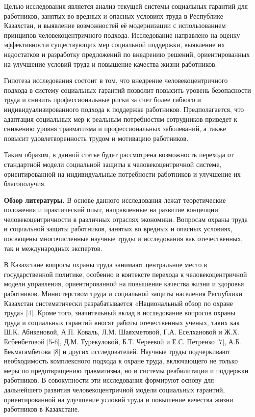 \begin{multicols}{2}
Целью исследования является анализ текущей системы социальных гарантий
для работников, занятых во вредных и опасных условиях труда в Республике
Казахстан, и выявление возможностей её модернизации с использованием
принципов человекоцентричного подхода. Исследование направлено на оценку
эффективности существующих мер социальной поддержки, выявление их
недостатков и разработку предложений по внедрению решений,
ориентированных на улучшение условий труда и повышение качества жизни
работников.

Гипотеза исследования состоит в том, что внедрение человекоцентричного
подхода в систему социальных гарантий позволит повысить уровень
безопасности труда и снизить профессиональные риски за счет более
гибкого и индивидуализированного подхода к поддержке работников.
Предполагается, что адаптация социальных мер к реальным потребностям
сотрудников приведет к снижению уровня травматизма и профессиональных
заболеваний, а также повысит удовлетворенность трудом и мотивацию
работников.

Таким образом, в данной статье будет рассмотрена возможность перехода от
стандартной модели социальной защиты к человекоцентричной системе,
ориентированной на индивидуальные потребности работников и улучшение их
благополучия.

{\bfseries Обзор литературы.} В основе данного исследования лежат
теоретические положения и практический опыт, направленные на развитие
концепции человекоцентричности в различных отраслях экономики. Вопросам
охраны труда и социальной защиты работников, занятых во вредных и
опасных условиях, посвящены многочисленные научные труды и исследования
как отечественных, так и международных экспертов.

В Казахстане вопросы охраны труда занимают центральное место в
государственной политике, особенно в контексте перехода к
человекоцентричной модели управления, ориентированной на повышение
качества жизни и здоровья работников. Министерством труда и социальной
защиты населения Республики Казахстан систематически разрабатывается
«Национальный обзор по охране труда» {[}4{]}. Кроме того, значительный
вклад в исследование вопросов охраны труда и социальных гарантий вносят
работы отечественных ученых, таких как Ш.К. Абикеновой, А.П. Коваль,
Л.М. Шаяхметовой, Г.А. Еселхановой и Ж.Х. Есбенбетовой {[}5-6{]}, Д.М.
Турекуловой, Б.Т. Череевой и Е.С. Петренко {[}7{]}, А.Б. Бекмагамбетова
{[}8{]} и других исследователей. Научные труды подчеркивают
необходимость комплексного подхода к охране труда, включающего не только
меры по предотвращению травматизма, но и системы реабилитации и
поддержки работников. В совокупности эти исследования формируют основу
для дальнейшего развития человекоцентричной модели социальных гарантий,
ориентированной на улучшение условий труда и повышение качества жизни
работников в Казахстане.


\end{multicols}

